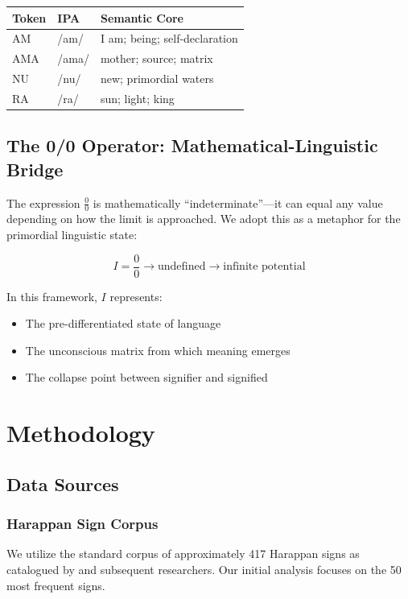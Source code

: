 \documentclass[12pt,a4paper]{article}
\begin{document}
\begin{center}
\begin{tabular}{lll}
\toprule
\textbf{Token} & \textbf{IPA} & \textbf{Semantic Core} \\
\midrule
AM & /am/ & I am; being; self-declaration \\
AMA & /ama/ & mother; source; matrix \\
NU & /nu/ & new; primordial waters \\
RA & /ra/ & sun; light; king \\
\bottomrule
\end{tabular}
\end{center}

\subsection{The 0/0 Operator: Mathematical-Linguistic Bridge}

The expression $\frac{0}{0}$ is mathematically ``indeterminate''---it can equal any value depending on how the limit is approached. We adopt this as a metaphor for the primordial linguistic state:

\[
I = \frac{0}{0} \rightarrow \text{undefined} \rightarrow \text{infinite potential}
\]

In this framework, $I$ represents:
\begin{itemize}
    \item The pre-differentiated state of language
    \item The unconscious matrix from which meaning emerges
    \item The collapse point between signifier and signified
\end{itemize}

\section{Methodology}

\subsection{Data Sources}

\subsubsection{Harappan Sign Corpus}
We utilize the standard corpus of approximately 417 Harappan signs as catalogued by \citet{parpola1994} and subsequent researchers. Our initial analysis focuses on the 50 most frequent signs.
\end{document}
